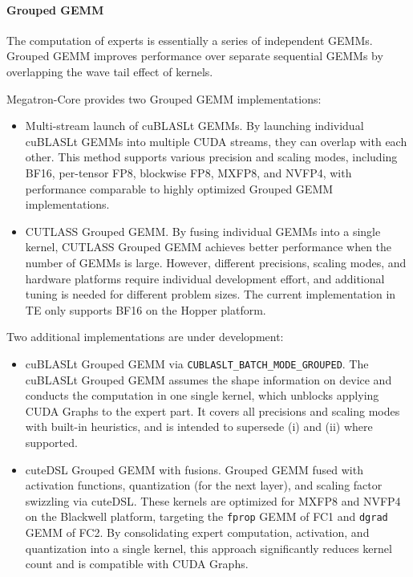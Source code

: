 \documentclass[10pt,logo,copyright]{nvidiatechreport}
\begin{document}
\paragraph{Grouped GEMM}\label{sec:grouped-gemm}

The computation of experts is essentially a series of independent GEMMs. Grouped GEMM improves performance over separate sequential GEMMs by overlapping the wave tail effect of kernels.

Megatron-Core provides two Grouped GEMM implementations:

\begin{itemize}
\item[i.] Multi-stream launch of cuBLASLt GEMMs.
By launching individual cuBLASLt GEMMs into multiple CUDA streams, they can overlap with each other. This method supports various precision and scaling modes, including BF16, per-tensor FP8, blockwise FP8, MXFP8, and NVFP4, with performance comparable to highly optimized Grouped GEMM implementations.

\item[ii.]\label{gmm:2} CUTLASS Grouped GEMM.
By fusing individual GEMMs into a single kernel, CUTLASS Grouped GEMM achieves better performance when the number of GEMMs is large. However, different precisions, scaling modes, and hardware platforms require individual development effort, and additional tuning is needed for different problem sizes. The current implementation in TE only supports BF16 on the Hopper platform.
\end{itemize}


Two additional implementations are under development:

\begin{itemize}
\item[iii.] cuBLASLt Grouped GEMM via \texttt{CUBLASLT\_BATCH\_MODE\_GROUPED}.
The cuBLASLt Grouped GEMM assumes the shape information on device and conducts the computation in one single kernel, which unblocks applying CUDA Graphs to the expert part. It covers all precisions and scaling modes with built-in heuristics, and is intended to supersede (i) and (ii) where supported.

\item[iv.] cuteDSL Grouped GEMM with fusions.
Grouped GEMM fused with activation functions, quantization (for the next layer), and scaling factor swizzling via cuteDSL. These kernels are optimized for MXFP8 and NVFP4~\cite{abecassis2025nvfp4} on the Blackwell platform, targeting the \texttt{fprop} GEMM of FC1 and \texttt{dgrad} GEMM of FC2. By consolidating expert computation, activation, and quantization into a single kernel, this approach significantly reduces kernel count and is compatible with CUDA Graphs.
\end{itemize}
\end{document}
